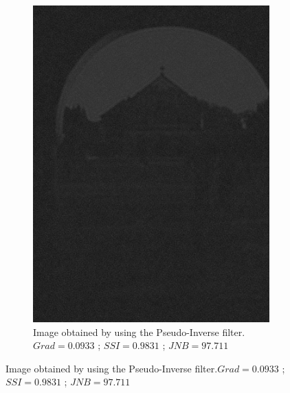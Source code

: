 \begin{figure}[H]
\begin{subfigure}[b]{0.35\textwidth}
                 \includegraphics[width=\textwidth]{memchu_pinv_noise.jpg}
                 \caption{Image obtained by using the Pseudo-Inverse filter.\newline $Grad=0.0933$ ; $SSI=0.9831$ ; $JNB=97.711$}
        \end{subfigure} 
        

\end{figure}
